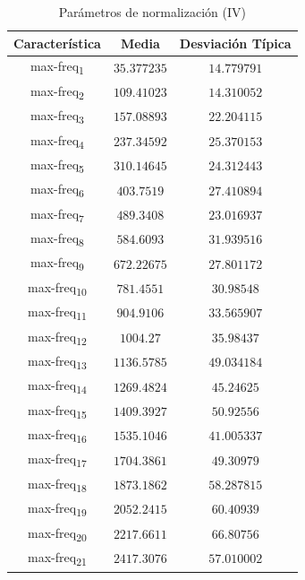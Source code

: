 \documentclass[12pt]{article}
\begin{document}
\begin{table}
	\caption{Parámetros de normalización (IV)}
	\centering
		\begin{tabular}{||c c c||}
			\hline
			Característica & Media & Desviación Típica  \\ [0.5ex]
			\hline\hline
			max-freq\textsubscript{1} & $35.377235$ & $14.779791$ \\
			\hline
			max-freq\textsubscript{2} & $109.41023$ & $14.310052$ \\
			\hline
			max-freq\textsubscript{3} & $157.08893$ & $22.204115$ \\
			\hline
			max-freq\textsubscript{4} & $237.34592$ & $25.370153$ \\
			\hline
			max-freq\textsubscript{5} & $310.14645$ & $24.312443$ \\
			\hline
			max-freq\textsubscript{6} & $403.7519$ & $27.410894$ \\
			\hline
			max-freq\textsubscript{7} & $489.3408$ & $23.016937$ \\
			\hline
			max-freq\textsubscript{8} & $584.6093$ & $31.939516$ \\
			\hline
			max-freq\textsubscript{9} & $672.22675$ & $27.801172$ \\
			\hline
			max-freq\textsubscript{10} & $781.4551$ & $30.98548$ \\
			\hline
			max-freq\textsubscript{11} & $904.9106$ & $33.565907$ \\
			\hline
			max-freq\textsubscript{12} & $1004.27$ & $35.98437$ \\
			\hline
			max-freq\textsubscript{13} & $1136.5785$ & $49.034184$ \\
			\hline
			max-freq\textsubscript{14} & $1269.4824$ & $45.24625$ \\
			\hline
			max-freq\textsubscript{15} & $1409.3927$ & $50.92556$ \\
			\hline
			max-freq\textsubscript{16} & $1535.1046$ & $41.005337$ \\
			\hline
			max-freq\textsubscript{17} & $1704.3861$ & $49.30979$ \\
			\hline
			max-freq\textsubscript{18} & $1873.1862$ & $58.287815$ \\
			\hline
			max-freq\textsubscript{19} & $2052.2415$ & $60.40939$ \\
			\hline
			max-freq\textsubscript{20} & $2217.6611$ & $66.80756$ \\
			\hline
			max-freq\textsubscript{21} & $2417.3076$ & $57.010002$ \\

\end{tabular}
\end{table}
\end{document}
